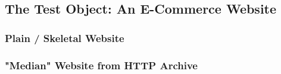\subsection{The Test Object: An E-Commerce Website}








\subsubsection{Plain / Skeletal Website}


    



\subsubsection{"Median" Website from HTTP Archive}


